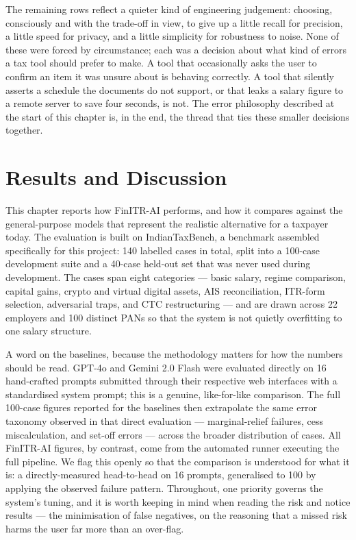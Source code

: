 \documentclass[12pt, a4paper, oneside]{report}
\begin{document}
The remaining rows reflect a quieter kind of engineering judgement: choosing,
consciously and with the trade-off in view, to give up a little recall for
precision, a little speed for privacy, and a little simplicity for robustness to
noise. None of these were forced by circumstance; each was a decision about what
kind of errors a tax tool should prefer to make. A tool that occasionally asks
the user to confirm an item it was unsure about is behaving correctly. A tool
that silently asserts a schedule the documents do not support, or that leaks a
salary figure to a remote server to save four seconds, is not. The error
philosophy described at the start of this chapter is, in the end, the thread
that ties these smaller decisions together.



\chapter{Results and Discussion}
\label{chap:results}

This chapter reports how FinITR-AI performs, and how it compares against the
general-purpose models that represent the realistic alternative for a taxpayer
today. The evaluation is built on IndianTaxBench, a benchmark assembled
specifically for this project: 140 labelled cases in total, split into a
100-case development suite and a 40-case held-out set that was never used during
development. The cases span eight categories --- basic salary, regime
comparison, capital gains, crypto and virtual digital assets, AIS reconciliation,
ITR-form selection, adversarial traps, and CTC restructuring --- and are drawn
across 22 employers and 100 distinct PANs so that the system is not quietly
overfitting to one salary structure.

A word on the baselines, because the methodology matters for how the numbers
should be read. GPT-4o and Gemini 2.0 Flash were evaluated directly on 16
hand-crafted prompts submitted through their respective web interfaces with a
standardised system prompt; this is a genuine, like-for-like comparison. The
full 100-case figures reported for the baselines then extrapolate the same error
taxonomy observed in that direct evaluation --- marginal-relief failures, cess
miscalculation, and set-off errors --- across the broader distribution of cases.
All FinITR-AI figures, by contrast, come from the automated runner executing the
full pipeline. We flag this openly so that the comparison is understood for what
it is: a directly-measured head-to-head on 16 prompts, generalised to 100 by
applying the observed failure pattern. Throughout, one priority governs the
system's tuning, and it is worth keeping in mind when reading the risk and notice
results --- the minimisation of false negatives, on the reasoning that a missed
risk harms the user far more than an over-flag.
\end{document}
